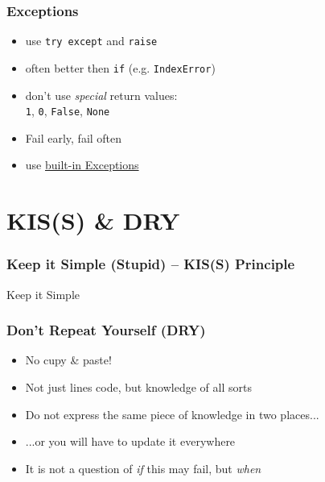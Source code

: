 \documentclass{beamer}
\begin{document}
\begin{frame}
 \frametitle{Exceptions}
  
\begin{itemize}
  \item use \texttt{try except} and \texttt{raise}
  \item often better then \texttt{if} (e.g. \texttt{IndexError})
\end{itemize}

\begin{example}
\end{example}

\begin{itemize}
  \item don't use \emph{special} return values: \\
 \texttt{1}, \texttt{0}, \texttt{False}, \texttt{None}
  \item Fail early, fail often
  \item use \href{http://docs.python.org/library/exceptions.html}{built-in Exceptions}
\end{itemize}

  
\end{frame}


\section{KIS(S) \& DRY}


\begin{frame}
 \frametitle{Keep it Simple (Stupid) -- KIS(S) Principle}
\centering

\alert<2>{\LARGE Keep it Simple}
  
\end{frame}


\begin{frame}
 \frametitle{Don't Repeat Yourself (DRY)}

\begin{itemize}
 \item No cupy \& paste!
\end{itemize}

\begin{itemize}
  \item Not just lines code, but knowledge of all sorts
  \item Do not express the same piece of knowledge in two places...
  \item ...or you will have to update it everywhere
\end{itemize}

\begin{itemize}
  \item It is not a question of \emph{if} this may fail, but \emph{when}
\end{itemize}
\end{frame}
\end{document}
